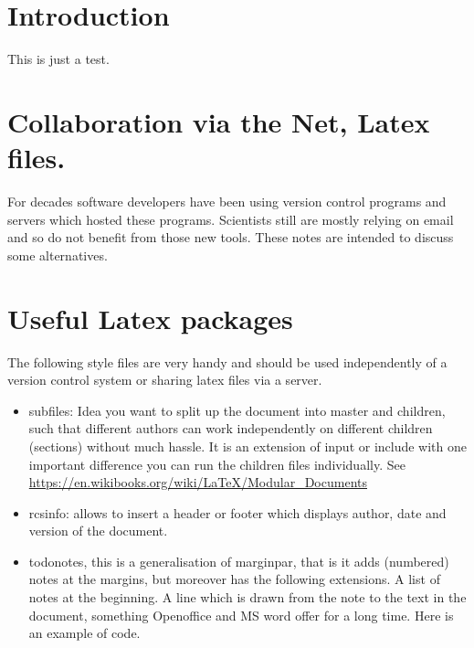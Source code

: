 \documentclass[11pt]{article}
\author{Uwe Brauer}
\date{\today}
\title{}
\begin{document}
\tableofcontents

\section{Introduction}
\label{sec:introduction}

This is just a test.



\section{Collaboration via the Net, Latex files.}
\label{sec:orgheadline1}

For decades software developers have been using version control
programs and servers which hosted these programs. Scientists still are
mostly relying on email and so do not benefit from those new tools.
These notes are intended to discuss some alternatives.

\section{Useful Latex packages}
\label{sec:orgheadline2}


The following style files  are very handy and should be used
independently of a version control system or sharing latex files via a
server. 


\begin{itemize}
\item subfiles: Idea you want to split up the document into master
and children, such that different authors can work
independently on different children (sections) without much
hassle. It is an extension of input or include with one
important difference you can run the children files
individually. See  \url{https://en.wikibooks.org/wiki/LaTeX/Modular_Documents}

\item rcsinfo: allows to insert a header or footer which displays
author, date and version of the document.

\item todonotes, this is a generalisation of marginpar, that is it
adds (numbered) notes at the margins, but moreover has  the
following extensions. A list of notes at the beginning. A line
which is drawn from the note to the text in the document,
something Openoffice and MS word offer for a long time. Here is
an example of code.
\end{itemize}
\end{document}
